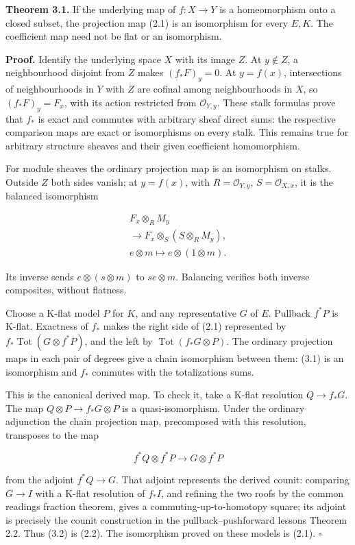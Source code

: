 \documentclass[
  english,
  11pt,
  a4paper,
]{article}
\begin{document}
\textbf{Theorem 3.1.} If the underlying map of \(f:X\to Y\) is a
homeomorphism onto a closed subset, the projection map (2.1) is an
isomorphism for every \(E,K\). The coefficient map need not be flat or
an isomorphism.

\textbf{Proof.} Identify the underlying space \(X\) with its image
\(Z\). At \(y\notin Z\), a neighbourhood disjoint from \(Z\) makes
\((f_*F)_y=0\). At \(y=f(x)\), intersections of neighbourhoods in \(Y\)
with \(Z\) are cofinal among neighbourhoods in \(X\), so
\((f_*F)_y=F_x\), with its action restricted from \(\mathcal O_{Y,y}\).
These stalk formulas prove that \(f_*\) is exact and commutes with
arbitrary sheaf direct sums: the respective comparison maps are exact or
isomorphisms on every stalk. This remains true for arbitrary structure
sheaves and their given coefficient homomorphism.

For module sheaves the ordinary projection map is an isomorphism on
stalks. Outside \(Z\) both sides vanish; at \(y=f(x)\), with
\(R=\mathcal O_{Y,y}\), \(S=\mathcal O_{X,x}\), it is the balanced
isomorphism

\[\begin{gathered}
F_x\otimes_R M_y\\
\longrightarrow F_x\otimes_S(S\otimes_R M_y),\\
e\otimes m\longmapsto e\otimes(1\otimes m).
\end{gathered}
\tag{3.1}\]

Its inverse sends \(e\otimes(s\otimes m)\) to \(se\otimes m\). Balancing
verifies both inverse composites, without flatness.

Choose a K-flat model \(P\) for \(K\), and any representative \(G\) of
\(E\). Pullback \(f^*P\) is K-flat. Exactness of \(f_*\) makes the right
side of (2.1) represented by \(f_*\operatorname{Tot}(G\otimes f^*P)\),
and the left by \(\operatorname{Tot}(f_*G\otimes P)\). The ordinary
projection maps in each pair of degrees give a chain isomorphism between
them: (3.1) is an isomorphism and \(f_*\) commutes with the
totalization\textquotesingle s sums.

This is the canonical derived map. To check it, take a K-flat resolution
\(Q\to f_*G\). The map \(Q\otimes P\to f_*G\otimes P\) is a
quasi-isomorphism. Under the ordinary adjunction the chain projection
map, precomposed with this resolution, transposes to the map

\[f^*Q\otimes f^*P\longrightarrow G\otimes f^*P
\tag{3.2}\]

from the adjoint \(f^*Q\to G\). That adjoint represents the derived
counit: comparing \(G\to I\) with a K-flat resolution of \(f_*I\), and
refining the two roofs by the common reading\textquotesingle s fraction
theorem, gives a commuting-up-to-homotopy square; its adjoint is
precisely the counit construction in the pullback--pushforward
lesson\textquotesingle s Theorem 2.2. Thus (3.2) is (2.2). The
isomorphism proved on these models is (2.1). \(\square\)
\end{document}
